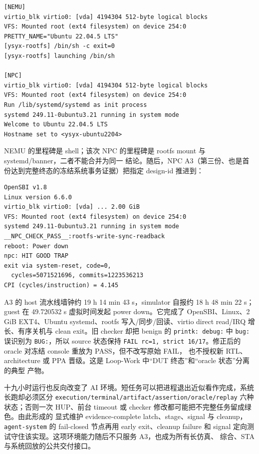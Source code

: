 \documentclass[UTF8,a4paper,zihao=-4,oneside]{ctexart}
\newcommand{\taskpath}[1]{\path{#1}}
\begin{document}
\begin{lstlisting}[language={},numbers=none,float=htbp,
  caption={NEMU 与 NPC 两个平台的分层日志节选}]
[NEMU]
virtio_blk virtio0: [vda] 4194304 512-byte logical blocks
VFS: Mounted root (ext4 filesystem) on device 254:0
PRETTY_NAME="Ubuntu 22.04.5 LTS"
[ysyx-rootfs] /bin/sh -c exit=0
[ysyx-rootfs] launching /bin/sh

[NPC]
virtio_blk virtio0: [vda] 4194304 512-byte logical blocks
VFS: Mounted root (ext4 filesystem) on device 254:0
Run /lib/systemd/systemd as init process
systemd 249.11-0ubuntu3.21 running in system mode
Welcome to Ubuntu 22.04.5 LTS
Hostname set to <ysyx-ubuntu2204>
\end{lstlisting}

NEMU 的里程碑是 shell；该次 NPC 的里程碑是 rootfs mount 与 systemd/banner，二者不能合并为同一
结论。随后，NPC A3（第三份、也是首份达到完整终态的冻结系统事务证据）把指定 design-id 推进到：

\begin{lstlisting}[language={},numbers=none,float=htbp,
  caption={NPC A3 Ubuntu 22.04 系统事务的关键 marker}]
OpenSBI v1.8
Linux version 6.6.0
virtio_blk virtio0: [vda] ... 2.00 GiB
VFS: Mounted root (ext4 filesystem) on device 254:0
systemd 249.11-0ubuntu3.21 running in system mode
__NPC_CHECK_PASS__:rootfs-write-sync-readback
reboot: Power down
npc: HIT GOOD TRAP
exit via system-reset, code=0,
  cycles=5071521696, commits=1223536213
CPI (cycles/instruction) = 4.145
\end{lstlisting}

A3 的 host 流水线墙钟约 19 h 14 min 43 s，simulator 自报约 18 h 48 min 22 s；guest 在
49.720532 s 虚拟时间发起 power down。它完成了 OpenSBI、Linux、2 GiB EXT4、Ubuntu systemd、rootfs
写入/同步/回读、virtio direct read/IRQ 增长、有序关机与 clean exit。旧 checker 却把 benign 的
\texttt{printk: debug:} 中 \texttt{bug:} 误识别为 \texttt{BUG:}，所以 source 状态保持
\texttt{FAIL rc=1, strict 16/17}。修正后的 oracle 对冻结 console 重放为 PASS，但不改写原始 FAIL，
也不授权新 RTL、architecture 或 PPA 晋级。这是 Loop-Work 中“DUT 终态”和“oracle 状态”分离的典型
产物。

十九小时运行也反向改变了 AI 环境。短任务可以把进程退出近似看作完成，系统长跑却必须区分
\texttt{execution/terminal/artifact/assertion/oracle/replay} 六种状态；否则一次 HUP、前台 timeout 或
checker 修改都可能把不完整任务留成绿色。由此形成的 \taskpath{task-run-status.sh} 显式维护
evidence-complete latch、stage、signal 与 cleanup，\texttt{agent-system} 的 fail-closed 节点再用 early
exit、cleanup failure 和 signal 定向测试守住该实现。这项环境能力随后不只服务 A3，也成为所有长仿真、
综合、STA 与系统回放的公共交付接口。
\end{document}
